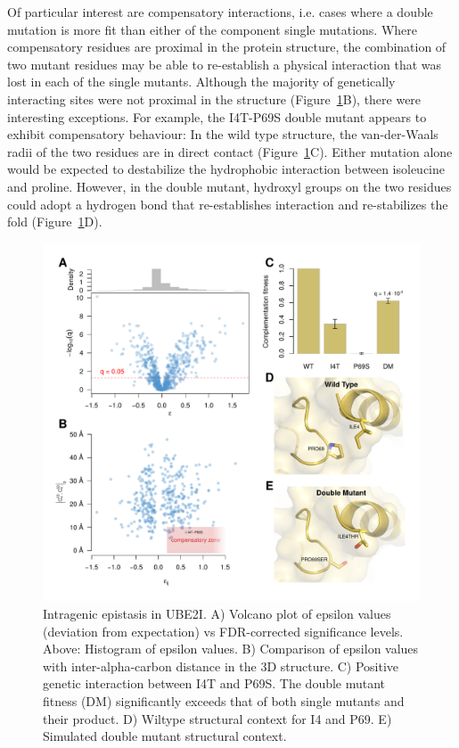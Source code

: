 Of particular interest are compensatory interactions, i.e. cases where a double mutation is more fit than either of the component single mutations.  Where compensatory residues are proximal in the protein structure, the combination of two mutant residues may be able to re-establish a physical interaction that was lost in each of the single mutants. Although the majority of genetically interacting sites were not proximal in the structure (Figure~\ref{fig:epsistasis}B), there were interesting exceptions. For example, the I4T-P69S double mutant appears to exhibit compensatory behaviour: In the wild type structure, the van-der-Waals radii of the two residues are in direct contact (Figure~\ref{fig:epsistasis}C). Either mutation alone would be expected to destabilize the hydrophobic interaction between isoleucine and proline.  However, in the double mutant, hydroxyl groups on the two residues could adopt a hydrogen bond that re-establishes interaction and re-stabilizes the fold (Figure~\ref{fig:epsistasis}D).

\begin{figure}[h!]
	\centering
	\includegraphics[width=\textwidth]{img/epistasis.pdf}
	\caption{Intragenic epistasis in UBE2I. A) Volcano plot of epsilon values (deviation from expectation) vs FDR-corrected significance levels. Above: Histogram of epsilon values. B) Comparison of epsilon values with inter-alpha-carbon distance in the 3D structure. C) Positive genetic interaction between I4T and P69S. The double mutant fitness (DM) significantly exceeds that of both single mutants and their product. D) Wiltype structural context for I4 and P69. E) Simulated double mutant structural context.}
	\label{fig:epsistasis}
\end{figure}


